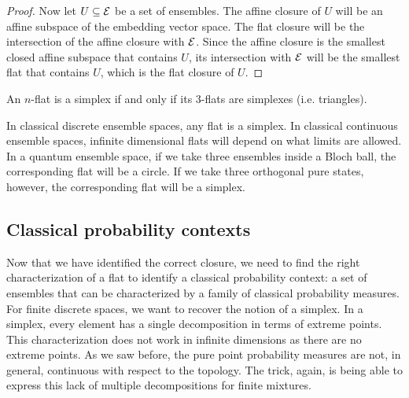 \begin{mathSection}
\begin{proof}
	Now let $U \subseteq \mathcal{E}$ be a set of ensembles. The affine closure of $U$ will be an affine subspace of the embedding vector space. The flat closure will be the intersection of the affine closure with $\mathcal{E}$. Since the affine closure is the smallest closed affine subspace that contains $U$, its intersection with $\mathcal{E}$ will be the smallest flat that contains $U$, which is the flat closure of $U$.
\end{proof}

\begin{conj}
	An $n$-flat is a simplex if and only if its $3$-flats are simplexes (i.e. triangles).
\end{conj}

\begin{remark}
	In classical discrete ensemble spaces, any flat is a simplex. In classical continuous ensemble spaces, infinite dimensional flats will depend on what limits are allowed. In a quantum ensemble space, if we take three ensembles inside a Bloch ball, the corresponding flat will be a circle. If we take three orthogonal pure states, however, the corresponding flat will be a simplex.
\end{remark}
\end{mathSection}

\subsection{Classical probability contexts}

Now that we have identified the correct closure, we need to find the right characterization of a flat to identify a classical probability context: a set of ensembles that can be characterized by a family of classical probability measures. For finite discrete spaces, we want to recover the notion of a simplex. In a simplex, every element has a single decomposition in terms of extreme points. This characterization does not work in infinite dimensions as there are no extreme points. As we saw before, the pure point probability measures are not, in general, continuous with respect to the topology. The trick, again, is being able to express this lack of multiple decompositions for finite mixtures.


